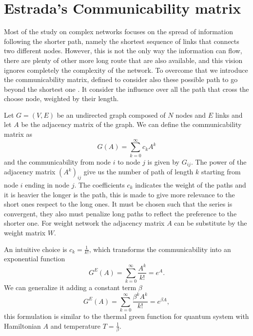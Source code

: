 \section{Estrada's Communicability matrix}

Most of the study on complex networks focuses on the spread of information following the shorter path, namely the shortest sequence of links that connects two different nodes. 
However, this is not the only way the information can flow, there are plenty of other more long route that are also available, and this vision ignores completely the complexity of the network.
To overcome that we introduce the communicability matrix, defined to consider also these possible path to go beyond the shortest one \cite{Estrada_2012}. It consider the influence over all the path that cross the choose node, weighted by their length.

Let $G=(V,E)$ be an undirected graph composed of $N$ nodes and $E$ links and let $A$ be the adjacency matrix of the graph.
We can define the communicability matrix as
\begin{equation}
    G(A) = \sum_{k=0}^{\infty}c_k A^k
\end{equation}
and the communicability from node $i$ to node $j$ is given by $G_{ij}$. The power of the adjacency matrix $(A^k)_{ij}$ give us the number of path of length $k$ starting from node $i$ ending in node $j$.
The coefficients $c_k$ indicates the weight of the paths and it is heavier the longer is the path, this is made to give more relevance to the short ones respect to the long ones. It must be chosen such that the series is convergent, they also must penalize long paths to reflect the preference to the shorter one.
For weight network the adjacency matrix $A$ can be substitute by the weight matrix $W$.

An intuitive choice is $c_k = \frac{1}{k!}$, which transforms the communicability into an exponential function \cite{Estrada_2008}
\begin{equation}\label{G_E}
    G^E(A) =\sum_{k=0}^{\infty} \frac{A^k}{k!} = e^{A} .
\end{equation}
We can generalize it adding a constant term $\beta$
\begin{equation}
    G^E(A) =\sum_{k=0}^{\infty} \frac{\beta^k A^k}{k!} = e^{\beta A} ,
\end{equation}
this formulation is similar to the thermal green function for quantum system with Hamiltonian $A$ and temperature $T = \frac{1}{\beta}$.

